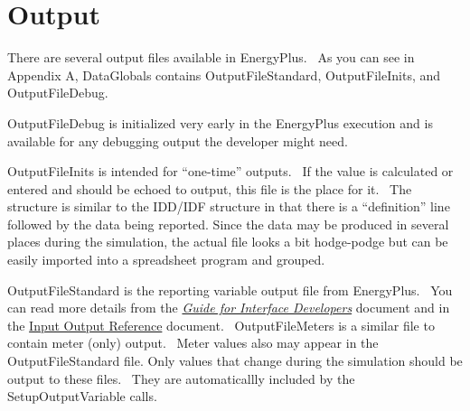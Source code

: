 \chapter{Output}\label{output}

There are several output files available in EnergyPlus.~ As you can see in Appendix A, DataGlobals contains OutputFileStandard, OutputFileInits, and OutputFileDebug.

OutputFileDebug is initialized very early in the EnergyPlus execution and is available for any debugging output the developer might need.

OutputFileInits is intended for ``one-time'' outputs.~ If the value is calculated or entered and should be echoed to output, this file is the place for it.~ The structure is similar to the IDD/IDF structure in that there is a ``definition'' line followed by the data being reported. Since the data may be produced in several places during the simulation, the actual file looks a bit hodge-podge but can be easily imported into a spreadsheet program and grouped.

OutputFileStandard is the reporting variable output file from EnergyPlus.~ You can read more details from the \href{InterfaceDeveloper.pdf}{\emph{Guide for Interface Developers}} document and in the \href{InputOutputReference.pdf}{Input Output Reference} document.~ OutputFileMeters is a similar file to contain meter (only) output.~ Meter values also may appear in the OutputFileStandard file. Only values that change during the simulation should be output to these files.~ They are automaticallly included by the SetupOutputVariable calls.
